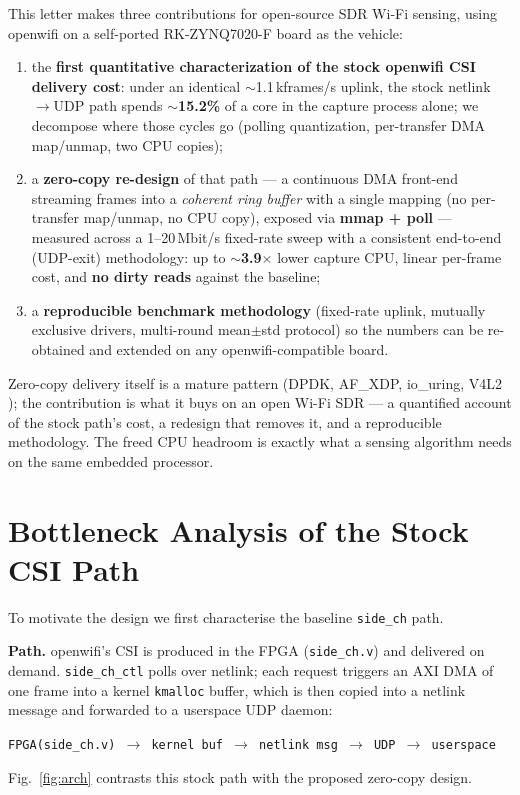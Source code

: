 \documentclass[10pt,a4paper]{article}
\begin{document}
This letter makes three contributions for open-source SDR Wi-Fi sensing, using
openwifi on a self-ported RK-ZYNQ7020-F board as the vehicle:
\begin{enumerate}
  \item the \textbf{first quantitative characterization of the stock openwifi
        CSI delivery cost}: under an identical $\sim$1.1\,kframes/s uplink,
        the stock netlink$\rightarrow$UDP path spends $\sim$\textbf{15.2\%}
        of a core in the capture process alone; we decompose where those
        cycles go (polling quantization, per-transfer DMA map/unmap, two CPU
        copies);
  \item a \textbf{zero-copy re-design} of that path --- a continuous DMA
        front-end streaming frames into a \emph{coherent ring buffer} with a
        single mapping (no per-transfer map/unmap, no CPU copy), exposed via
        \textbf{mmap + poll} --- measured across a 1--20\,Mbit/s fixed-rate
        sweep with a consistent end-to-end (UDP-exit) methodology: up to
        $\sim$\textbf{3.9$\times$} lower capture CPU, linear per-frame cost,
        and \textbf{no dirty reads} against the baseline;
  \item a \textbf{reproducible benchmark methodology} (fixed-rate uplink,
        mutually exclusive drivers, multi-round mean$\pm$std protocol) so the
        numbers can be re-obtained and extended on any openwifi-compatible
        board.
\end{enumerate}

Zero-copy delivery itself is a mature pattern (DPDK, AF\_XDP, io\_uring, V4L2
\cite{dpdk,afxdp,iouring}); the contribution is what it buys on an open Wi-Fi
SDR --- a quantified account of the stock path's cost, a redesign that
removes it, and a reproducible methodology. The freed CPU headroom is exactly
what a sensing algorithm needs on the same embedded processor.

\section{Bottleneck Analysis of the Stock CSI Path}

To motivate the design we first characterise the baseline \texttt{side\_ch}
path.

\textbf{Path.} openwifi's CSI is produced in the FPGA (\texttt{side\_ch.v})
and delivered on demand. \texttt{side\_ch\_ctl} polls over netlink; each
request triggers an AXI DMA of one frame into a kernel \texttt{kmalloc}
buffer, which is then copied into a netlink message and forwarded to a
userspace UDP daemon:
\begin{center}
  \texttt{FPGA(side\_ch.v) $\rightarrow$ kernel buf $\rightarrow$ netlink msg
  $\rightarrow$ UDP $\rightarrow$ userspace}
\end{center}
Fig.~\ref{fig:arch} contrasts this stock path with the proposed zero-copy
design.
\end{document}
